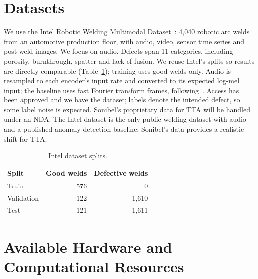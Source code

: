 \documentclass[11pt]{article}
\begin{document}
\section{Datasets}

We use the Intel Robotic Welding Multimodal Dataset~\cite{intel}: 4,040 robotic arc welds from an automotive production floor, with audio, video, sensor time series and post-weld images.
We focus on audio. Defects span 11 categories, including porosity, burnthrough, spatter and lack of fusion.
We reuse Intel's splits so results are directly comparable (Table~\ref{tab:splits}); training uses good welds only.
Audio is resampled to each encoder's input rate and converted to its expected log-mel input; the baseline uses fast Fourier transform frames, following~\cite{intel}.
Access has been approved and we have the dataset; labels denote the intended defect, so some label noise is expected. Sonibel's proprietary data for TTA will be handled under an NDA.
The Intel dataset is the only public welding dataset with audio and a published anomaly detection baseline; Sonibel's data provides a realistic shift for TTA.

\begin{table}[h]
\centering
\begin{tabular}{lrr}
    \toprule
    \textbf{Split} & \textbf{Good welds} & \textbf{Defective welds} \\
    \midrule
    Train & 576 & 0 \\
    Validation & 122 & 1,610 \\
    Test & 121 & 1,611 \\
    \bottomrule
\end{tabular}
\caption{Intel dataset splits.}
\label{tab:splits}
\end{table}

\section{Available Hardware and Computational Resources}
\end{document}
